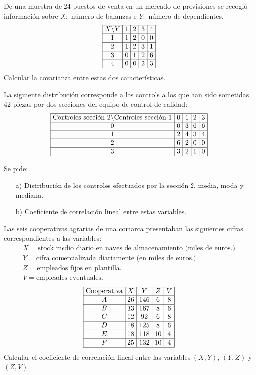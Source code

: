 \documentclass[12pt]{article}
\begin{document}
\begin{prob}
{De una muestra de 24 puestos de venta en un mercado de provisiones se  recogió
información sobre $X:$ número de balanzas e $Y:$ número de dependientes.
$$\vbox{\halign{\offinterlineskip\strut\vrule\ $#$ &\vrule
\ $#$ &\vrule\ $#$ &\vrule\ $#$ &\vrule\  $#$
\vrule\cr\noalign{\hrule}X\backslash Y &
1&2&3&4\cr\noalign{\hrule}1&1&2&0&0\cr\noalign{\hrule}
2&1&2&3&1\cr\noalign{\hrule}3&0&1&2&6\cr\noalign{\hrule}
4&0&0&2&3\cr\noalign{\hrule}}}$$ Calcular la covarianza entre
estas dos características.}
\end{prob}

\begin{prob}
{La siguiente distribución corresponde a los controls a los  que han sido sometidas 42
piezas por dos secciones del equipo de control de calidad:
$$\vbox{\halign{\offinterlineskip\strut\vrule\ $#$ &\vrule
\ $#$ &\vrule\ $#$ &\vrule\ $#$ &\vrule\  $#$
\vrule\cr\noalign{\hrule} \hbox{Controles sección 2}\backslash
\hbox{Controles sección 1} &
0&1&2&3\cr\noalign{\hrule}0&0&3&6&6\cr\noalign{\hrule}
1&2&4&3&4\cr\noalign{\hrule}2&6&2&0&0\cr\noalign{\hrule}
3&3&2&1&0\cr\noalign{\hrule}}}$$

Se pide:
\begin{itemize}
\item[a)] {Distribución de los controles efectuados por la sección 2,
media, moda y mediana.}
\item[b)] {Coeficiente de correlación lineal entre estas
variables.}
\end{itemize}
}
\end{prob}

\begin{prob}
{Las seis cooperativas agrarias de una comarca presentaban las
siguientes cifras correspondientes a las variables:
$$
\begin{array}{l}
X=\mbox{stock medio diario en naves de almacenamiento (miles de euros.)}\\ Y= \mbox{cifra
comercializada diariamente (en miles de euros.)}\\ Z=\mbox{empleados fijos en
plantilla.}\\ V=  \mbox{empleados eventuales.}
\end{array}
$$
$$\vbox{\halign{\offinterlineskip\strut\vrule\ $#$ &\vrule
\ $#$ &\vrule\ $#$ &\vrule\ $#$ &\vrule\  $#$ \vrule\cr\noalign{\hrule}
\hbox{Cooperativa}&X&Y&Z&V\cr\noalign{\hrule}A&26&146&6&8 \cr\noalign{\hrule}
B&33&167&8&6\cr\noalign{\hrule}C&12&92&6&8\cr\noalign{\hrule}
D&18&125&8&6\cr\noalign{\hrule}E&18&118&10&4
\cr\noalign{\hrule}F&25&132&10&4\cr\noalign{\hrule}}}$$ Calcular el coeficiente de
correlación lineal entre las variables $(X,Y)$, $(Y,Z)$ y $(Z,V)$.}
\end{prob}
\end{document}
